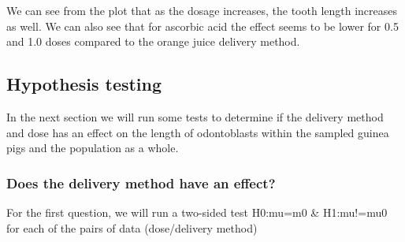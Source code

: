 \documentclass[
]{article}
\newenvironment{Shaded}{\begin{snugshade}}{\end{snugshade}}
\newcommand{\DataTypeTok}[1]{\textcolor[rgb]{0.13,0.29,0.53}{#1}}
\newcommand{\FloatTok}[1]{\textcolor[rgb]{0.00,0.00,0.81}{#1}}
\newcommand{\KeywordTok}[1]{\textcolor[rgb]{0.13,0.29,0.53}{\textbf{#1}}}
\newcommand{\NormalTok}[1]{#1}
\newcommand{\OperatorTok}[1]{\textcolor[rgb]{0.81,0.36,0.00}{\textbf{#1}}}
\newcommand{\StringTok}[1]{\textcolor[rgb]{0.31,0.60,0.02}{#1}}
\begin{document}
We can see from the plot that as the dosage increases, the tooth length
increases as well. We can also see that for ascorbic acid the effect
seems to be lower for 0.5 and 1.0 doses compared to the orange juice
delivery method.

\hypertarget{hypothesis-testing}{%
\subsection{Hypothesis testing}\label{hypothesis-testing}}

In the next section we will run some tests to determine if the delivery
method and dose has an effect on the length of odontoblasts within the
sampled guinea pigs and the population as a whole.

\hypertarget{does-the-delivery-method-have-an-effect}{%
\subsubsection{Does the delivery method have an
effect?}\label{does-the-delivery-method-have-an-effect}}

For the first question, we will run a two-sided test H0:mu=m0 \&
H1:mu!=mu0 for each of the pairs of data (dose/delivery method)

\begin{Shaded}
\end{Shaded}
\end{document}
